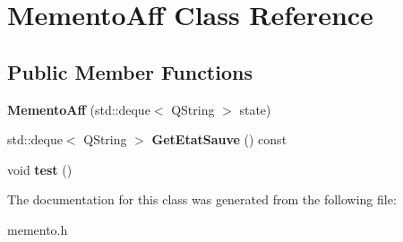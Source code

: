 \hypertarget{class_memento_aff}{\section{Memento\-Aff Class Reference}
\label{class_memento_aff}
}
\subsection*{Public Member Functions}
\begin{DoxyCompactItemize}
\item 
\hypertarget{class_memento_aff_a0286b7961cf51f82ca2241b7aa8a9d3b}{{\bfseries Memento\-Aff} (std\-::deque$<$ Q\-String $>$ state)}\label{class_memento_aff_a0286b7961cf51f82ca2241b7aa8a9d3b}

\item 
\hypertarget{class_memento_aff_ab2e4c86ddea4e8da29e7b3410c860c97}{std\-::deque$<$ Q\-String $>$ {\bfseries Get\-Etat\-Sauve} () const }\label{class_memento_aff_ab2e4c86ddea4e8da29e7b3410c860c97}

\item 
\hypertarget{class_memento_aff_ab71f491485e0515fb09740c7ace4acfc}{void {\bfseries test} ()}\label{class_memento_aff_ab71f491485e0515fb09740c7ace4acfc}

\end{DoxyCompactItemize}


The documentation for this class was generated from the following file\-:\begin{DoxyCompactItemize}
\item 
memento.\-h\end{DoxyCompactItemize}
